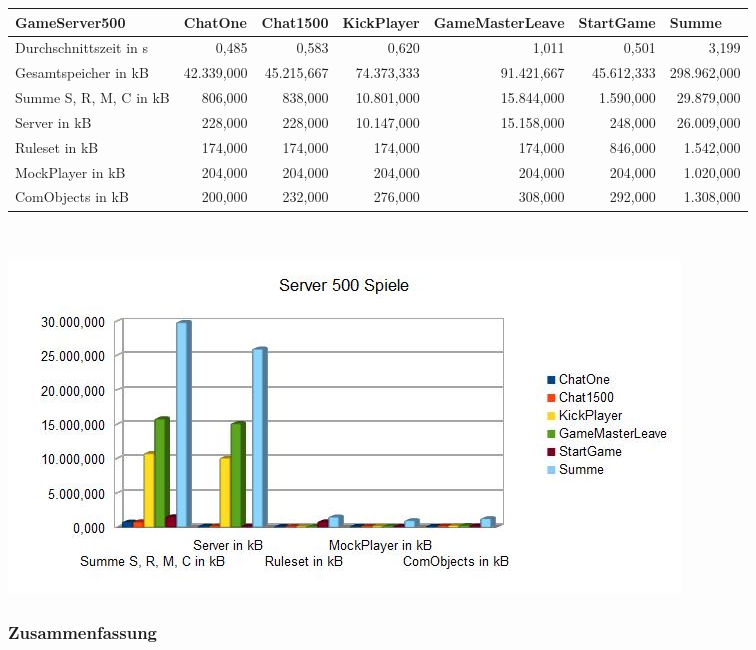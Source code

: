 \documentclass[a4paper]{article}
\begin{document}
\noindent
\begin{tabular}{|l|r|r|r|r|r|r|}
\hline
GameServer500 & \multicolumn{1}{l|}{ChatOne} & \multicolumn{1}{l|}{Chat1500} & \multicolumn{1}{l|}{KickPlayer} & \multicolumn{1}{l|}{GameMasterLeave} & \multicolumn{1}{l|}{StartGame} & \multicolumn{1}{l|}{Summe} \\ \hline \hline
Durchschnittszeit in s & 0,485 & 0,583 & 0,620 & 1,011 & 0,501 & 3,199 \\ \hline
Gesamtspeicher in kB & 42.339,000 & 45.215,667 & 74.373,333 & 91.421,667 & 45.612,333 & 298.962,000 \\ \hline
Summe S, R, M, C in kB & 806,000 & 838,000 & 10.801,000 & 15.844,000 & 1.590,000 & 29.879,000 \\ \hline
Server in kB & 228,000 & 228,000 & 10.147,000 & 15.158,000 & 248,000 & 26.009,000 \\ \hline
Ruleset in kB & 174,000 & 174,000 & 174,000 & 174,000 & 846,000 & 1.542,000 \\ \hline
MockPlayer in kB & 204,000 & 204,000 & 204,000 & 204,000 & 204,000 & 1.020,000 \\ \hline
ComObjects in kB & 200,000 & 232,000 & 276,000 & 308,000 & 292,000 & 1.308,000 \\ \hline
\end{tabular}
\ \\
\begin{center}
\includegraphics[scale=0.7]{8}
\end{center}

\subsubsection{Zusammenfassung}
\end{document}
